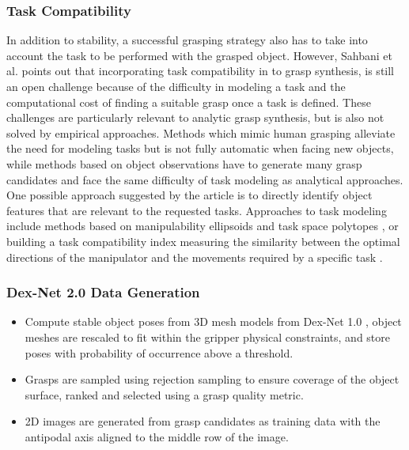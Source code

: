 \documentclass[12pt]{article}
\begin{document}

    \subsubsection{Task Compatibility}
    In addition to stability, a successful grasping strategy also has to take into account the task to be performed with the grasped object. However, Sahbani et al. \cite{Sahbani2012} points out that incorporating task compatibility in to grasp synthesis, is still an open challenge because of the difficulty in modeling a task and the computational cost of finding a suitable grasp once a task is defined. These challenges are particularly relevant to analytic grasp synthesis, but is also not solved by empirical approaches. Methods which mimic human grasping alleviate the need for modeling tasks but is not fully automatic when facing new objects, while methods based on object observations have to generate many grasp candidates and face the same difficulty of task modeling as analytical approaches. One possible approach suggested by the article is to directly identify object features that are relevant to the requested tasks. Approaches to task modeling include methods based on manipulability ellipsoids \cite{Yoshikawa1990} and task space polytopes \cite{lee1997}, or building a task compatibility index measuring the similarity between the optimal directions of the manipulator and the movements required by a specific task \cite{chiu1988}.

    \subsubsection{Dex-Net 2.0 Data Generation} \label{dexnet-generation}
    \begin{itemize}
        \item Compute stable object poses from 3D mesh models from Dex-Net 1.0 \cite{mahler2016}, object meshes are rescaled to fit within the gripper physical constraints, and store poses with probability of occurrence above a threshold.
        \item Grasps are sampled using rejection sampling to ensure coverage of the object surface, ranked and selected using a grasp quality metric.
        \item 2D images are generated from grasp candidates as training data with the antipodal axis aligned to the middle row of the image.
    \end{itemize}
\end{document}
